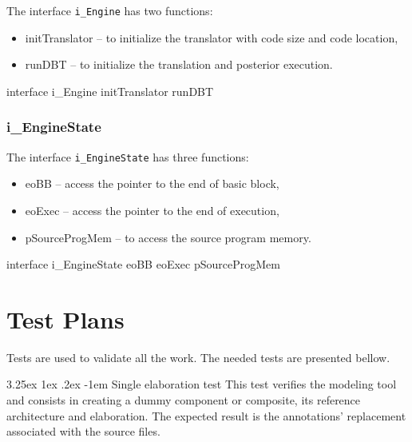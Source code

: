 \documentclass[11pt]{report}
\makeatletter
\renewcommand\paragraph{\@startsection{paragraph}{5}{\z@}%
	{3.25ex \@plus1ex \@minus.2ex}%
	{-1em}%
	{\normalfont\normalsize\bfseries}}
\makeatother
\begin{document}
			\par The interface \texttt{i\_Engine} has two functions:
			\begin{itemize}
				\item initTranslator -- to initialize the translator with code size and code location,
				\item runDBT -- to initialize the translation and posterior execution.
			\end{itemize}
			
			\begin{EL}
			interface i_Engine{
				initTranslator
				runDBT
			}
			\end{EL}
			
			\subsubsection*{i\_EngineState}		
			
			\par The interface \texttt{i\_EngineState} has three functions:
			\begin{itemize}
				\item eoBB -- access the pointer to the end of basic block,
				\item eoExec -- access the pointer to the end of execution,
				\item pSourceProgMem -- to access the source program memory.
			\end{itemize}	
			
			\begin{EL}
			interface i_EngineState{
				eoBB
				eoExec
				pSourceProgMem
			}
			\end{EL}	

	\section{Test Plans}
	
	\par Tests are used to validate all the work. The needed tests are presented bellow.
	
	\paragraph{Single elaboration test} This test verifies the modeling tool and consists in creating a dummy component or composite, its reference architecture and elaboration. The expected result is the annotations' replacement associated with the source files.  
	
\end{document}

